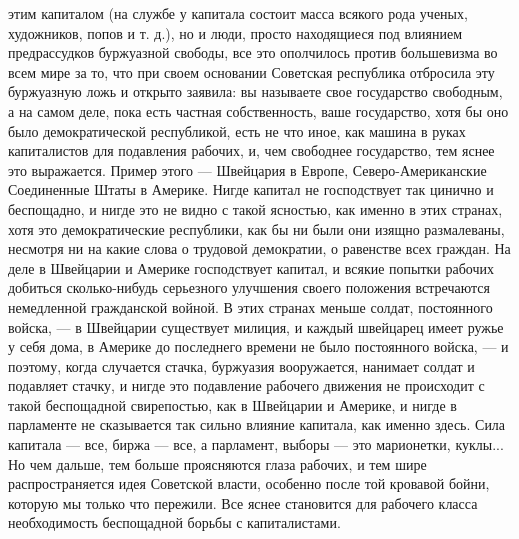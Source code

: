 \documentclass[12pt]{article}
\newcommand{\parnum}{(\arabic{parcount})}
\newcounter{parcount}
\newenvironment{parnumbers}{%
  \par%
  \everypar{\noindent \stepcounter{parcount}\marginpar[]{\parnum}}%
}{}
\begin{document}
\begin{parnumbers}
этим капиталом (на службе у капитала состоит масса всякого рода ученых, художников, попов и т. д.), но и люди, просто находящиеся под влиянием предрассудков буржуазной свободы, все это ополчилось против большевизма во всем мире за то, что при своем основании Советская республика отбросила эту буржуазную ложь и открыто заявила: вы называете свое государство свободным, а на самом деле, пока есть частная собственность, ваше государство, хотя бы оно было демократической республикой, есть не что иное, как машина в руках капиталистов для подавления рабочих, и, чем свободнее государство, тем яснее это выражается. Пример этого — Швейцария в Европе, Северо-Американские Соединенные Штаты в Америке. Нигде капитал не господствует так цинично и беспощадно, и нигде это не видно с такой ясностью, как именно в этих странах, хотя это демократические республики, как бы ни были они изящно размалеваны, несмотря ни на какие слова о трудовой демократии, о равенстве всех граждан. На деле в Швейцарии и Америке господствует капитал, и всякие попытки рабочих добиться сколько-нибудь серьезного улучшения своего положения встречаются немедленной гражданской войной. В этих странах меньше солдат, постоянного войска, — в Швейцарии существует милиция, и каждый швейцарец имеет ружье у себя дома, в Америке до последнего времени не было постоянного войска, — и поэтому, когда случается стачка, буржуазия вооружается, нанимает солдат и подавляет стачку, и нигде это подавление рабочего движения не происходит с такой беспощадной свирепостью, как в Швейцарии и Америке, и нигде в парламенте не сказывается так сильно влияние капитала, как именно здесь. Сила капитала — все, биржа — все, а парламент, выборы — это марионетки, куклы... Но чем дальше, тем больше проясняются глаза рабочих, и тем шире распространяется идея Советской власти, особенно после той кровавой бойни, которую мы только что пережили. Все яснее становится для рабочего класса необходимость беспощадной борьбы с капиталистами.


\end{parnumbers}
\end{document}
